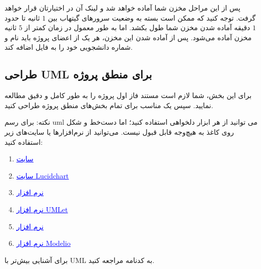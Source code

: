 \documentclass[]{article}
\begin{document}
پس از این مراحل مخزن شما آماده خواهد شد و لینک آن در اختیارتان قرار خواهد گرفت. توجه کنید که ممکن است بسته به وضعیت سرورهای گیتهاب بین $1$ ثانیه تا حدود $1$ دقیقه آماده شدن مخزن شما طول بکشد. اما به طور معمول در زمان کمتر از $5$ ثانیه مخزن آماده می‌شود. پس از آماده شدن این مخزن، هر یک از اعضای پروژه باید نام و شماره دانشجویی خود را به فایل  اضافه کند. 

\newpage
\subsection*{{\titr طراحی UML برای منطق پروژه}}
\label{subsec:uml}

برای این بخش، شما لازم است مستند فاز اول پروژه را به طور کامل و دقیق مطالعه نمایید. سپس یک  مناسب برای تمام بخش‌های منطق پروژه طراحی کنید.

نکته: برای رسم uml می توانید از هر ابزار دلخواهی استفاده کنید؛ اما دست‌خط و شکل روی کاغذ به هیچ‌وجه قابل قبول نیست. می‌توانید از نرم‌افزارها یا سایت‌های زیر استفاده کنید:

\begin{enumerate}
	
	\item
	
	\href{https://app.diagrams.net/}{\textcolor{blue}{\underline{سایت }}} 
	
	\item
	
	\href{https://www.lucidchart.com/pages/}{\textcolor{blue}{\underline{سایت Lucidchart}}} 
	
	
	\item
	
	\href{https://products.office.com/en/visio/flowchart-software}{\textcolor{blue}{\underline{نرم افزار }}} 
	
	
	\item
	
	\href{https://www.umlet.com/changes.htm}{\textcolor{blue}{\underline{نرم افزار UMLet}}} 
	
	
	\item
	
	\href{https://online.visual-paradigm.com/}{\textcolor{blue}{\underline{نرم افزار }}} 
	
	
	\item
	
	\href{https://www.modelio.org/}{\textcolor{blue}{\underline{نرم افزار Modelio}}} 
	
	

	
	
	
\end{enumerate}


برای آشنایی بیش‌تر با UML به کدنامه مراجعه کنید.
\end{document}
